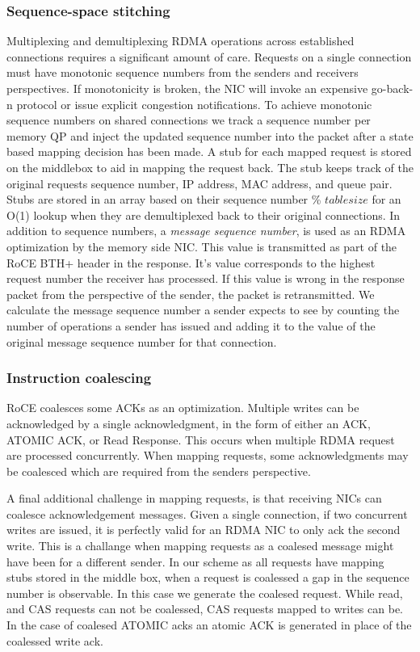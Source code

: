 \subsubsection{Sequence-space stitching}

Multiplexing and demultiplexing RDMA operations across established connections
requires a significant amount of care. Requests on a single connection must have
monotonic sequence numbers from the senders and receivers perspectives. If
monotonicity is broken, the NIC will invoke an expensive go-back-n protocol or
issue explicit congestion notifications. To achieve monotonic sequence numbers
on shared connections we track a sequence number per memory QP and inject the
updated sequence number into the packet after a state based mapping decision has
been made. A stub for each mapped request is stored on the middlebox to aid in
mapping the request back. The stub keeps track of the original requests sequence
number, IP address, MAC address, and queue pair. Stubs are stored in an array
based on their sequence number \% $table size$ for an O(1) lookup when they are
demultiplexed back to their original connections.
In addition to sequence numbers, a \textit{message sequence number}, is used as
an RDMA optimization by the memory side NIC. This value is transmitted as part
of the RoCE BTH+ header in the response. It's value corresponds to the highest
request number the receiver has processed. If this value is wrong in the
response packet from the perspective of the sender, the packet is retransmitted.
We calculate the message sequence number a sender expects to see by counting the
number of operations a sender has issued and adding it to the value of the
original message sequence number for that connection.

\subsubsection{Instruction coalescing} RoCE coalesces some ACKs as an optimization.
Multiple writes can be acknowledged by a single acknowledgment, in the form of
either an ACK, ATOMIC ACK, or Read Response. This occurs when multiple RDMA
request are processed concurrently. When mapping requests, some acknowledgments
may be coalesced which are required from the senders perspective.

A final additional challenge in mapping
requests, is that receiving NICs can coalesce acknowledgement messages. Given a
single connection, if two concurrent writes are issued, it is perfectly valid
for an RDMA NIC to only ack the second write. This is a challange when mapping
requests as a coalesed message might have been for a different sender. In our
scheme as all requests have mapping stubs stored in the middle box, when a
request is coalessed a gap in the sequence number is observable. In this case we
generate the coalesed request. While read, and CAS requests can not be
coalessed, CAS requests mapped to writes can be. In the case of coalesed ATOMIC
acks an atomic ACK is generated in place of the coalessed write ack.



